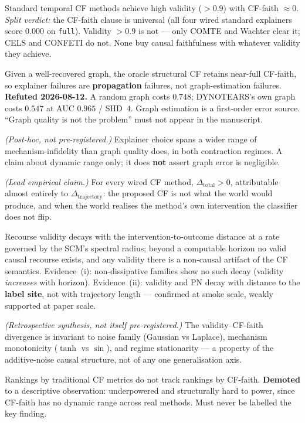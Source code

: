 \documentclass[11pt]{article}
\newcommand{\Deltatotal}{\Delta_{\mathrm{total}}}
\newcommand{\Deltatraj}{\Delta_{\mathrm{trajectory}}}
\begin{document}
\begin{description}[leftmargin=*, style=nextline]
  \item[H1.] Standard temporal CF methods achieve high validity ($> 0.9$)
    with CF-faith $\approx 0$.
    \emph{Split verdict:} the CF-faith clause is universal (all four
    wired standard explainers score $0.000$ on \texttt{full}). Validity
    $> 0.9$ is not --- only COMTE and Wachter clear it; CELS and CONFETI
    do not. None buy causal faithfulness with whatever validity they
    achieve.

  \item[H2.] Given a well-recovered graph, the oracle structural CF
    retains near-full CF-faith, so explainer failures are
    \textbf{propagation} failures, not graph-estimation failures.
    \textbf{Refuted 2026-08-12.} A random graph costs $0.748$;
    DYNOTEARS's own graph costs $0.547$ at AUC $0.965$ / SHD~$4$. Graph
    estimation is a first-order error source. ``Graph quality is not the
    problem'' must not appear in the manuscript.

  \item[H2$'$.] \emph{(Post-hoc, not pre-registered.)} Explainer choice
    spans a wider range of mechanism-infidelity than graph quality does,
    in both contraction regimes. A claim about dynamic range only; it
    does \textbf{not} assert graph error is negligible.

  \item[H3.] \emph{(Lead empirical claim.)} For every wired CF method,
    $\Deltatotal > 0$, attributable almost entirely to $\Deltatraj$:
    the proposed CF is not what the world would produce, and when the
    world realises the method's own intervention the classifier does not
    flip.

  \item[H4.] Recourse validity decays with the intervention-to-outcome
    distance at a rate governed by the SCM's spectral radius; beyond a
    computable horizon no valid causal recourse exists, and any validity
    there is a non-causal artifact of the CF semantics.
    Evidence~(i): non-dissipative families show no such decay (validity
    \emph{increases} with horizon). Evidence~(ii): validity and PN decay
    with distance to the \textbf{label site}, not with trajectory
    length --- confirmed at smoke scale, weakly supported at paper
    scale.

  \item[H5.] \emph{(Retrospective synthesis, not itself pre-registered.)}
    The validity--CF-faith divergence is invariant to noise family
    (Gaussian vs Laplace), mechanism monotonicity ($\tanh$ vs $\sin$),
    and regime stationarity --- a property of the additive-noise causal
    structure, not of any one generalisation axis.

  \item[H6.] Rankings by traditional CF metrics do not track rankings by
    CF-faith. \textbf{Demoted} to a descriptive observation:
    underpowered and structurally hard to power, since CF-faith has no
    dynamic range across real methods. Must never be labelled the key
    finding.
\end{description}
\end{document}
